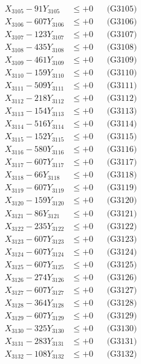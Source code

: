 \documentclass[a4paper,10pt]{article}
\begin{document}
{\begin{align}
X_{3105} - 91Y_{3105} &\leq +0 && \text{(G3105)} \\
X_{3106} - 607Y_{3106} &\leq +0 && \text{(G3106)} \\
X_{3107} - 123Y_{3107} &\leq +0 && \text{(G3107)} \\
X_{3108} - 435Y_{3108} &\leq +0 && \text{(G3108)} \\
X_{3109} - 461Y_{3109} &\leq +0 && \text{(G3109)} \\
X_{3110} - 159Y_{3110} &\leq +0 && \text{(G3110)} \\
\allowbreak
X_{3111} - 509Y_{3111} &\leq +0 && \text{(G3111)} \\
X_{3112} - 218Y_{3112} &\leq +0 && \text{(G3112)} \\
X_{3113} - 154Y_{3113} &\leq +0 && \text{(G3113)} \\
X_{3114} - 516Y_{3114} &\leq +0 && \text{(G3114)} \\
X_{3115} - 152Y_{3115} &\leq +0 && \text{(G3115)} \\
X_{3116} - 580Y_{3116} &\leq +0 && \text{(G3116)} \\
X_{3117} - 607Y_{3117} &\leq +0 && \text{(G3117)} \\
X_{3118} - 66Y_{3118} &\leq +0 && \text{(G3118)} \\
X_{3119} - 607Y_{3119} &\leq +0 && \text{(G3119)} \\
X_{3120} - 159Y_{3120} &\leq +0 && \text{(G3120)} \\
\allowbreak
X_{3121} - 86Y_{3121} &\leq +0 && \text{(G3121)} \\
X_{3122} - 235Y_{3122} &\leq +0 && \text{(G3122)} \\
X_{3123} - 607Y_{3123} &\leq +0 && \text{(G3123)} \\
X_{3124} - 607Y_{3124} &\leq +0 && \text{(G3124)} \\
X_{3125} - 607Y_{3125} &\leq +0 && \text{(G3125)} \\
X_{3126} - 274Y_{3126} &\leq +0 && \text{(G3126)} \\
X_{3127} - 607Y_{3127} &\leq +0 && \text{(G3127)} \\
X_{3128} - 364Y_{3128} &\leq +0 && \text{(G3128)} \\
X_{3129} - 607Y_{3129} &\leq +0 && \text{(G3129)} \\
X_{3130} - 325Y_{3130} &\leq +0 && \text{(G3130)} \\
\allowbreak
X_{3131} - 283Y_{3131} &\leq +0 && \text{(G3131)} \\
X_{3132} - 108Y_{3132} &\leq +0 && \text{(G3132)} \\

\end{align}}
\end{document}
